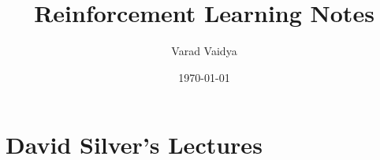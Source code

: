 \documentclass[working,a4paper]{article}
\title{Reinforcement Learning Notes}
\author{Varad Vaidya}
\date{\today}
\begin{document}
  \createintro

\part{David Silver's Lectures}
  
  
  \clearpage
  
  \clearpage
  
  \clearpage
  


  
\end{document}
